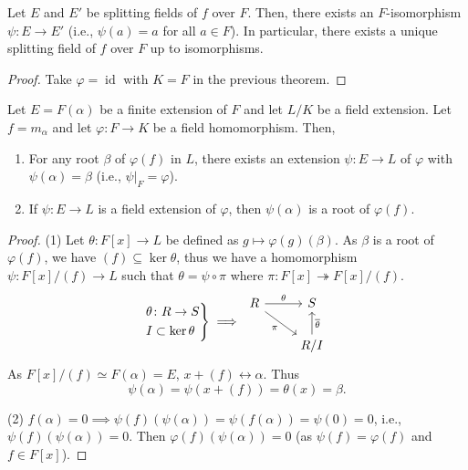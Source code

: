\documentclass[twoside]{article}
\DeclareMathOperator\id{id}
\theoremstyle{remark}
\newcounter{theorem}
\begin{document}
\begin{corollary}
  Let \(E\) and \(E'\) be splitting fields of \(f\) over \(F\). Then, there exists an \(F\)-isomorphism \(\psi\colon E \to E'\) (i.e., \(\psi(a) = a\) for all \(a \in F\)). In particular, there exists a unique splitting field of \(f\) over \(F\) up to isomorphisms.
\end{corollary}

\begin{proof}
  Take \(\varphi=\id\) with \(K=F\) in the previous theorem.
\end{proof}

\begin{lemma}
  Let \(E=F(\alpha)\) be a finite extension of \(F\) and let \(L/K\) be a field extension. Let \(f = m_\alpha\) and let \(\varphi\colon F \to K\) be a field homomorphism. Then,
  \begin{enumerate}[label=\textup{(\arabic*)}, nosep]
    \item For any root \(\beta\) of \(\varphi(f)\) in \(L\), there exists an extension \(\psi\colon E \to L\) of \(\varphi\) with \(\psi(\alpha) = \beta\) (i.e., \(\psi|_F = \varphi\)).
    \item If \(\psi\colon E \to L\) is a field extension of \(\varphi\), then \(\psi(\alpha)\) is a root of \(\varphi(f)\).
  \end{enumerate}
\end{lemma}

\begin{proof}
  (1) Let \(\theta\colon F[x] \to L\) be defined as \(g \mapsto \varphi(g)(\beta)\). As \(\beta\) is a root of \(\varphi(f)\), we have \((f) \subseteq \ker\theta\), thus we have a homomorphism \(\psi\colon F[x] / (f) \to L\) such that \(\theta = \psi \circ \pi\) where \(\pi\colon F[x] \twoheadrightarrow F[x]/(f)\).
  \begin{displaymath}
    \begin{rcases}
      \theta\colon R \to S \\ I \subset \ker\theta
    \end{rcases}
    \implies
    \begin{tikzcd}
      R\rar["\theta"]\arrow[dr,"\pi"swap] & S \\ & R/I\uar["\overline{\theta}"swap]
    \end{tikzcd}
  \end{displaymath}
  As \(F[x]/(f) \simeq F(\alpha) = E\), \(x+(f) \leftrightarrow \alpha\). Thus
  \[ \psi(\alpha) = \psi(x+(f)) = \theta(x) = \beta. \]
  
  \smallskip
  
  (2) \(f(\alpha) = 0 \implies \psi(f)(\psi(\alpha)) = \psi(f(\alpha)) = \psi(0) = 0\), i.e., \(\psi(f)(\psi(\alpha)) = 0\). Then \(\varphi(f)(\psi(\alpha)) = 0\) (as \(\psi(f) = \varphi(f)\) and \(f \in F[x]\)).
\end{proof}
\end{document}
